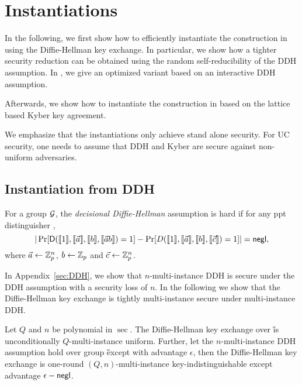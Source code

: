 \section{Instantiations}\label{sec:inst}
In the following, we first show how to efficiently instantiate the construction in  using the Diffie-Hellman key exchange. In particular, we show how a tighter security reduction can be obtained using the random self-reducibility of the DDH assumption. In , we give an optimized variant based on an interactive DDH assumption.

Afterwards, we show how to instantiate the construction in  based on the lattice based Kyber key agreement. 

We emphasize that the instantiations only achieve stand alone security. For UC security, one needs to assume that DDH and Kyber are secure against non-uniform adversaries. 


\subsection{Instantiation from DDH}



\begin{definition}
For a group $\mathcal{G}$, the \emph{decisional Diffie-Hellman} assumption is hard if for any ppt distinguisher \D,
$$
|\Pr[ \mathsf D(\llbracket 1\rrbracket,\llbracket \vec{a}\rrbracket,\llbracket b\rrbracket,\llbracket \vec{a}b\rrbracket)=1]-\Pr[ D(\llbracket 1\rrbracket,\llbracket \vec{a}\rrbracket,\llbracket b\rrbracket,\llbracket \vec{c}\rrbracket)=1]|=\mathsf{negl},
$$
where $\vec{a}\leftarrow\mathbb Z_p^n$, $b\leftarrow\mathbb Z_p$ and $\vec{c}\leftarrow\mathbb Z_p^n$.
\end{definition}

In Appendix~\ref{sec:DDH}, we show that $n$-multi-instance DDH is secure under the DDH assumption with a security loss of $n$. In the following we show that the Diffie-Hellman key exchange is tightly multi-instance secure under multi-instance DDH. 

\begin{lemma}\label{lem:DDH}
Let $Q$ and $n$ be polynomial in $\sec$.
The Diffie-Hellman key exchange over \G is unconditionally $Q$-multi-instance uniform. Further, let the $n$-multi-instance DDH assumption hold over group \G except with advantage $\epsilon$, then the Diffie-Hellman key exchange is one-round $(Q,n)$-multi-instance key-indistinguishable except advantage $\epsilon-\mathsf{negl}$. 
\end{lemma}

